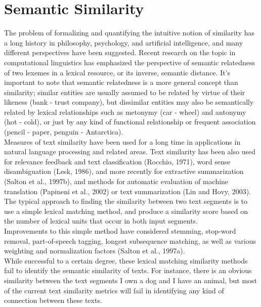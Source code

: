 \section{Semantic Similarity}
The problem of formalizing and quantifying the intuitive notion of similarity has a long history in philosophy, psychology, and artificial intelligence, and many different perspectives have been suggested. Recent research on the topic in computational linguistics has emphasized the perspective of semantic relatedness of two lexemes in a lexical resource, or its inverse, semantic distance. It’s important to note that semantic relatedness is a more general concept than similarity; similar entities are usually assumed to be related by virtue of their likeness (bank - trust company), but dissimilar entities may also be semantically related by lexical relationships such as metonymy (car - wheel) and antonymy (hot - cold), or just by any kind of functional relationship or frequent association (pencil - paper, penguin - Antarctica).\\

Measures of text similarity have been used for a long time in applications in natural language processing and related areas. Text similarity has been also used for relevance feedback and text classification (Rocchio, 1971), word sense disambiguation (Lesk, 1986), and more recently for extractive summarization (Salton et al., 1997b), and methods for automatic evaluation of machine translation (Papineni et al., 2002) or text summarization (Lin and Hovy, 2003). \\
The typical approach to finding the similarity between two text segments is to use a simple lexical matching method, and produce a similarity score based on the number of lexical units that occur in both input segments. \\
Improvements to this simple method have considered stemming, stop-word removal, part-of-speech tagging, longest subsequence matching, as well as various weighting and normalization factors (Salton et al., 1997a).\\
While successful to a certain degree, these lexical matching similarity methods fail to identify the semantic similarity of texts. For instance, there is an obvious similarity between the text segments I own a dog and I have an animal, but most of the current text similarity metrics will fail in identifying any kind of connection between these texts. \\

